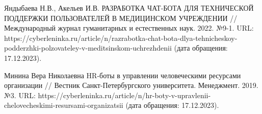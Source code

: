 \documentclass{article}
\begin{document}
Яндыбаева Н.В., Акельев И.В. РАЗРАБОТКА ЧАТ-БОТА ДЛЯ ТЕХНИЧЕСКОЙ ПОДДЕРЖКИ ПОЛЬЗОВАТЕЛЕЙ В МЕДИЦИНСКОМ УЧРЕЖДЕНИИ // Международный журнал гуманитарных и естественных наук. 2022. №9-1. URL: https://cyberleninka.ru/article/n/razrabotka-chat-bota-dlya-tehnicheskoy-podderzhki-polzovateley-v-meditsinskom-uchrezhdenii (дата обращения: 17.12.2023).

Минина Вера Николаевна HR-боты в управлении человеческими ресурсами организации // Вестник Санкт-Петербургского университета. Менеджмент. 2019. №3. URL: https://cyberleninka.ru/article/n/hr-boty-v-upravlenii-chelovecheskimi-resursami-organizatsii (дата обращения: 17.12.2023).
\end{document}
